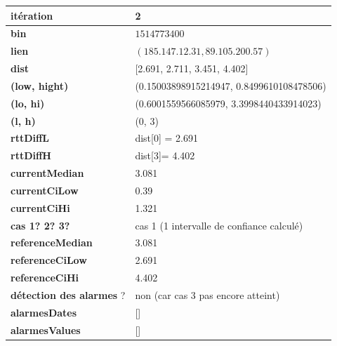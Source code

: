 \begin{table}[H]
	\centering
	
	\begin{tabularx}{\linewidth}{|l|X| }
		\hline
		\textbf{itération} & 2	\\ \hline
		\textbf{bin} & $1514773400$ \\ \hline
		\textbf{lien} & $(185.147.12.31, 89.105.200.57)$  \\ \hline
		\textbf{dist}& [2.691, 2.711, 3.451, 4.402]	\\ \hline
		\textbf{(low, hight)}& (0.15003898915214947, 0.8499610108478506) 	\\ \hline
		\textbf{(lo, hi)}&(0.6001559566085979, 3.3998440433914023)  \\ \hline
		\textbf{(l, h)} & (0, 3) 	\\ \hline
		\textbf{rttDiffL}& dist[0] = 2.691	\\ \hline
		\textbf{rttDiffH}& dist[3]= 4.402	\\ \hline
		\textbf{currentMedian}& 3.081	\\ \hline
		\textbf{currentCiLow}&  0.39 	\\ \hline
		\textbf{currentCiHi}& 1.321	\\ \hline
		\textbf{	cas 1? 2? 3?}& cas 1 (1 intervalle de confiance calculé)  \\ \hline
		\textbf{referenceMedian}& 3.081	\\ \hline
		\textbf{referenceCiLow}& 2.691	\\ \hline
		\textbf{referenceCiHi}&4.402	\\ \hline
		\textbf{détection des alarmes} ?& non (car cas 3 pas  encore atteint)	\\ \hline
		\textbf{alarmesDates}& []	\\ \hline
		\textbf{alarmesValues}& []	\\ \hline
		
		
	\end{tabularx}
\end{table}

